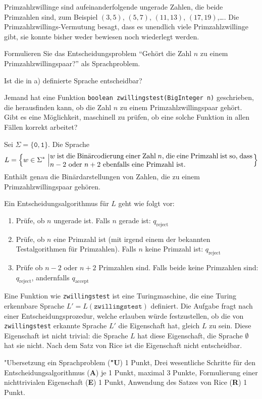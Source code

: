 Primzahlzwillinge sind aufeinanderfolgende ungerade Zahlen, die beide
Primzahlen sind, zum Beispiel $(3,5)$, $(5,7)$, $(11,13)$, $(17,19)$,\dots.
Die Primzahlzwillings-Vermutung besagt, dass es unendlich viele
Primzahlzwillinge gibt, sie konnte bisher weder bewiesen noch wiederlegt
werden.


\begin{teilaufgaben}
\item Formulieren Sie das Entscheidungsproblem ``Gehört die Zahl $n$ zu
einem Primzahlzwillingspaar?'' als Sprachproblem.
\item Ist die in a) definierte Sprache entscheidbar?
\item Jemand hat eine Funktion \texttt{boolean zwillingstest(BigInteger n)}
geschrieben, die herausfinden kann, ob die Zahl $n$ zu einem
Primzahlzwillingspaar gehört.
Gibt es eine Möglichkeit, maschinell zu prüfen, ob eine solche Funktion
in allen Fällen korrekt arbeitet?
\end{teilaufgaben}

\begin{loesung}
\begin{teilaufgaben}
\item Sei $\Sigma=\{\texttt{0},\texttt{1}\}$. Die Sprache
\[
L=\left\{w\in\Sigma^*\,\left|
\begin{minipage}{4truein}
$w$ ist die Binärcodierung einer Zahl $n$, die eine Primzahl ist
so, dass $n-2$ oder $n+2$ ebenfalls eine Primzahl ist.
\end{minipage}
\right.
\right\}
\]
Enthält genau die Binärdarstellungen von Zahlen, die zu einem
Primzahlzwillingspaar gehören.
\item
Ein Entscheidungsalgorithmus für $L$ geht wie folgt vor:
\begin{enumerate}
\item Prüfe, ob $n$ ungerade ist. Falls $n$ gerade ist: $q_\text{reject}$
\item Prüfe, ob $n$ eine Primzahl ist (mit irgend einem der bekannten
Testalgorithmen für Primzahlen). Falls $n$ keine Primzahl ist:
$q_{\text{reject}}$
\item Prüfe ob $n-2$ oder $n+2$ Primzahlen sind. Falls beide keine
Primzahlen sind: $q_{\text{reject}}$, andernfalls $q_{\text{accept}}$
\end{enumerate}
\item
Eine Funktion wie \texttt{zwillingstest} ist eine Turingmaschine, die
eine Turing erkennbare Sprache $L'=L(\texttt{zwillingstest})$ definiert.
Die Aufgabe fragt nach einer Entscheidungsprozedur, welche erlauben
würde festzustellen, ob die von \texttt{zwillingstest} erkannte
Sprache $L'$ die Eigenschaft hat, gleich $L$ zu sein. Diese
Eigenschaft ist nicht trivial: die Sprache $L$ hat diese Eigenschaft,
die Sprache $\emptyset$ hat sie nicht. Nach dem Satz von Rice ist
die Eigenschaft nicht entscheidbar.
\qedhere
\end{teilaufgaben}
\end{loesung}

\begin{bewertung}
"Ubersetzung ein Sprachproblem ({\bf "U}) 1 Punkt,
Drei wesentliche Schritte für den Entscheidungsalgorithmus ({\bf A})
je 1 Punkt, maximal 3 Punkte,
Formulierung einer nichttrivialen Eigenschaft ({\bf E}) 1 Punkt,
Anwendung des Satzes von Rice ({\bf R}) 1 Punkt.
\end{bewertung}

